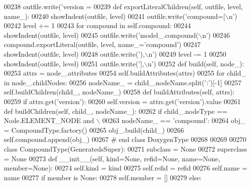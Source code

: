 \begin{DoxyCode}
{{{{{{{{{{{{{{{{{{{{{{{00238             outfile.write(\textcolor{stringliteral}{'version = %
00239     \textcolor{keyword}{def }exportLiteralChildren(self, outfile, level, name\_):
00240         showIndent(outfile, level)
00241         outfile.write(\textcolor{stringliteral}{'compound=[\(\backslash\)n'})
00242         level += 1
00243         \textcolor{keywordflow}{for} compound \textcolor{keywordflow}{in} self.compound:
00244             showIndent(outfile, level)
00245             outfile.write(\textcolor{stringliteral}{'model\_.compound(\(\backslash\)n'})
00246             compound.exportLiteral(outfile, level, name\_=\textcolor{stringliteral}{'compound'})
00247             showIndent(outfile, level)
00248             outfile.write(\textcolor{stringliteral}{'),\(\backslash\)n'})
00249         level -= 1
00250         showIndent(outfile, level)
00251         outfile.write(\textcolor{stringliteral}{'],\(\backslash\)n'})
00252     \textcolor{keyword}{def }build(self, node\_):
00253         attrs = node\_.attributes
00254         self.buildAttributes(attrs)
00255         \textcolor{keywordflow}{for} child\_ \textcolor{keywordflow}{in} node\_.childNodes:
00256             nodeName\_ = child\_.nodeName.split(\textcolor{stringliteral}{':'})[-1]
00257             self.buildChildren(child\_, nodeName\_)
00258     \textcolor{keyword}{def }buildAttributes(self, attrs):
00259         \textcolor{keywordflow}{if} attrs.get(\textcolor{stringliteral}{'version'}):
00260             self.version = attrs.get(\textcolor{stringliteral}{'version'}).value
00261     \textcolor{keyword}{def }buildChildren(self, child\_, nodeName\_):
00262         \textcolor{keywordflow}{if} child\_.nodeType == Node.ELEMENT\_NODE \textcolor{keywordflow}{and} \(\backslash\)
00263             nodeName\_ == \textcolor{stringliteral}{'compound'}:
00264             obj\_ = CompoundType.factory()
00265             obj\_.build(child\_)
00266             self.compound.append(obj\_)
00267 \textcolor{comment}{# end class DoxygenType}
00268 
00269 
00270 \textcolor{keyword}{class }CompoundType(GeneratedsSuper):
00271     subclass = \textcolor{keywordtype}{None}
00272     superclass = \textcolor{keywordtype}{None}
00273     \textcolor{keyword}{def }__init__(self, kind=None, refid=None, name=None, member=None):
00274         self.kind = kind
00275         self.refid = refid
00276         self.name = name
00277         \textcolor{keywordflow}{if} member \textcolor{keywordflow}{is} \textcolor{keywordtype}{None}:
00278             self.member = []
00279         \textcolor{keywordflow}{else}:
}}}}}}}}}}}}}}}}}}}}}}}}
\end{DoxyCode}
